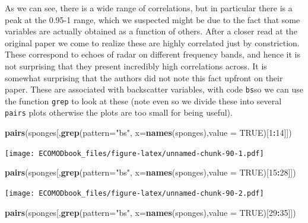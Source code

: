 \documentclass[
]{book}
\newenvironment{Shaded}{\begin{snugshade}}{\end{snugshade}}
\newcommand{\AttributeTok}[1]{\textcolor[rgb]{0.13,0.29,0.53}{#1}}
\newcommand{\ConstantTok}[1]{\textcolor[rgb]{0.56,0.35,0.01}{#1}}
\newcommand{\DecValTok}[1]{\textcolor[rgb]{0.00,0.00,0.81}{#1}}
\newcommand{\FunctionTok}[1]{\textcolor[rgb]{0.13,0.29,0.53}{\textbf{#1}}}
\newcommand{\NormalTok}[1]{#1}
\newcommand{\SpecialCharTok}[1]{\textcolor[rgb]{0.81,0.36,0.00}{\textbf{#1}}}
\newcommand{\StringTok}[1]{\textcolor[rgb]{0.31,0.60,0.02}{#1}}
\begin{document}
As we can see, there is a wide range of correlations, but in particular there is a peak at the 0.95-1 range, which we suspected might be due to the fact that some variables are actually obtained as a function of others. After a closer read at the original paper we come to realize these are highly correlated just by constriction. These correspond to echoes of radar on different frequency bands, and hence it is not surprising that they present incredibly high correlations across. It is somewhat surprising that the authors did not note this fact upfront on their paper. These are associated with backscatter variables, with code \texttt{bs}so we can use the function \texttt{grep} to look at these (note even so we divide these into several \texttt{pairs} plots otherwise the plots are too small for being useful).

\begin{Shaded}
\begin{Highlighting}[]
\FunctionTok{pairs}\NormalTok{(sponges[,}\FunctionTok{grep}\NormalTok{(}\AttributeTok{pattern=}\StringTok{"bs"}\NormalTok{, }\AttributeTok{x=}\FunctionTok{names}\NormalTok{(sponges),}\AttributeTok{value =} \ConstantTok{TRUE}\NormalTok{)[}\DecValTok{1}\SpecialCharTok{:}\DecValTok{14}\NormalTok{]])}
\end{Highlighting}
\end{Shaded}

\texttt{[image: ECOMODbook\_files/figure-latex/unnamed-chunk-90-1.pdf]}

\begin{Shaded}
\begin{Highlighting}[]
\FunctionTok{pairs}\NormalTok{(sponges[,}\FunctionTok{grep}\NormalTok{(}\AttributeTok{pattern=}\StringTok{"bs"}\NormalTok{, }\AttributeTok{x=}\FunctionTok{names}\NormalTok{(sponges),}\AttributeTok{value =} \ConstantTok{TRUE}\NormalTok{)[}\DecValTok{15}\SpecialCharTok{:}\DecValTok{28}\NormalTok{]])}
\end{Highlighting}
\end{Shaded}

\texttt{[image: ECOMODbook\_files/figure-latex/unnamed-chunk-90-2.pdf]}

\begin{Shaded}
\begin{Highlighting}[]
\FunctionTok{pairs}\NormalTok{(sponges[,}\FunctionTok{grep}\NormalTok{(}\AttributeTok{pattern=}\StringTok{"bs"}\NormalTok{, }\AttributeTok{x=}\FunctionTok{names}\NormalTok{(sponges),}\AttributeTok{value =} \ConstantTok{TRUE}\NormalTok{)[}\DecValTok{29}\SpecialCharTok{:}\DecValTok{35}\NormalTok{]])}
\end{Highlighting}
\end{Shaded}
\end{document}
